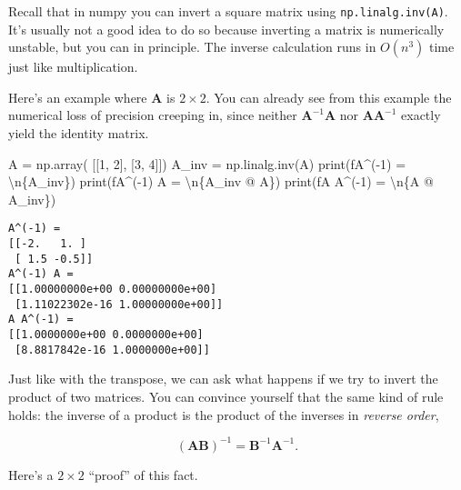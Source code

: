 \documentclass[
  letterpaper,
  DIV=11,
  numbers=noendperiod]{scrreprt}
\newenvironment{Shaded}{\begin{snugshade}}{\end{snugshade}}
\newcommand{\BuiltInTok}[1]{\textcolor[rgb]{0.00,0.23,0.31}{#1}}
\newcommand{\CharTok}[1]{\textcolor[rgb]{0.13,0.47,0.30}{#1}}
\newcommand{\DecValTok}[1]{\textcolor[rgb]{0.68,0.00,0.00}{#1}}
\newcommand{\NormalTok}[1]{\textcolor[rgb]{0.00,0.23,0.31}{#1}}
\newcommand{\OperatorTok}[1]{\textcolor[rgb]{0.37,0.37,0.37}{#1}}
\newcommand{\SpecialCharTok}[1]{\textcolor[rgb]{0.37,0.37,0.37}{#1}}
\newcommand{\SpecialStringTok}[1]{\textcolor[rgb]{0.13,0.47,0.30}{#1}}
\begin{document}
Recall that in numpy you can invert a square matrix using
\texttt{np.linalg.inv(A)}. It's usually not a good idea to do so because
inverting a matrix is numerically unstable, but you can in principle.
The inverse calculation runs in \(O(n^3)\) time just like
multiplication.

Here's an example where \(\mathbf{A}\) is \(2 \times 2\). You can
already see from this example the numerical loss of precision creeping
in, since neither \(\mathbf{A}^{-1}\mathbf{A}\) nor
\(\mathbf{A}\mathbf{A}^{-1}\) exactly yield the identity matrix.

\begin{Shaded}
\begin{Highlighting}[]
\NormalTok{A }\OperatorTok{=}\NormalTok{ np.array(}
\NormalTok{    [[}\DecValTok{1}\NormalTok{, }\DecValTok{2}\NormalTok{], }
\NormalTok{     [}\DecValTok{3}\NormalTok{, }\DecValTok{4}\NormalTok{]])}
\NormalTok{A\_inv }\OperatorTok{=}\NormalTok{ np.linalg.inv(A)}
\BuiltInTok{print}\NormalTok{(}\SpecialStringTok{f\textquotesingle{}A\^{}({-}1) = }\CharTok{\textbackslash{}n}\SpecialCharTok{\{}\NormalTok{A\_inv}\SpecialCharTok{\}}\SpecialStringTok{\textquotesingle{}}\NormalTok{)}
\BuiltInTok{print}\NormalTok{(}\SpecialStringTok{f\textquotesingle{}A\^{}({-}1) A = }\CharTok{\textbackslash{}n}\SpecialCharTok{\{}\NormalTok{A\_inv }\OperatorTok{@}\NormalTok{ A}\SpecialCharTok{\}}\SpecialStringTok{\textquotesingle{}}\NormalTok{)}
\BuiltInTok{print}\NormalTok{(}\SpecialStringTok{f\textquotesingle{}A A\^{}({-}1) = }\CharTok{\textbackslash{}n}\SpecialCharTok{\{}\NormalTok{A }\OperatorTok{@}\NormalTok{ A\_inv}\SpecialCharTok{\}}\SpecialStringTok{\textquotesingle{}}\NormalTok{)}
\end{Highlighting}
\end{Shaded}

\begin{verbatim}
A^(-1) = 
[[-2.   1. ]
 [ 1.5 -0.5]]
A^(-1) A = 
[[1.00000000e+00 0.00000000e+00]
 [1.11022302e-16 1.00000000e+00]]
A A^(-1) = 
[[1.0000000e+00 0.0000000e+00]
 [8.8817842e-16 1.0000000e+00]]
\end{verbatim}

Just like with the transpose, we can ask what happens if we try to
invert the product of two matrices. You can convince yourself that the
same kind of rule holds: the inverse of a product is the product of the
inverses in \emph{reverse order},

\[(\mathbf{A}\mathbf{B})^{-1} = \mathbf{B}^{-1} \mathbf{A}^{-1}.\]

Here's a \(2 \times 2\) ``proof'' of this fact.
\end{document}
